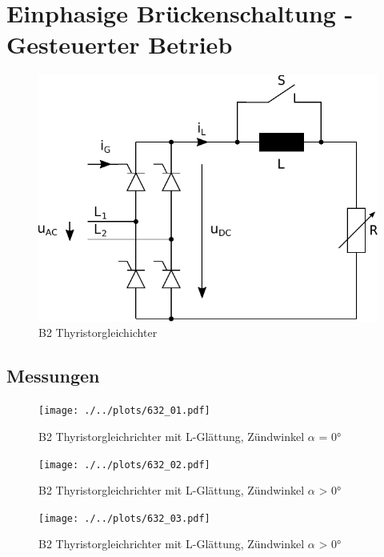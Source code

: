 \section{Einphasige Brückenschaltung - Gesteuerter Betrieb}

\begin{figure}[h!]
    \centering
    \includegraphics[scale=\sscale]{./../fig/b2_thyristor.pdf}
    \caption{B2 Thyristorgleichichter}
    \label{fig:b2_tyristor}
\end{figure}

\subsection{Messungen}

\begin{figure}[h!]
    \centering
    \texttt{[image: ./../plots/632\_01.pdf]}
    \caption{B2 Thyristorgleichrichter mit L-Glättung, Zündwinkel $\alpha$ = 0°}
    \label{fig:b2_diode_l16}
\end{figure}

\begin{figure}[h!]
    \centering
    \texttt{[image: ./../plots/632\_02.pdf]}
    \caption{B2 Thyristorgleichrichter mit L-Glättung, Zündwinkel $\alpha$ > 0°}
    \label{fig:b2_diode_l11}
\end{figure}

\begin{figure}[h!]
    \centering
    \texttt{[image: ./../plots/632\_03.pdf]}
    \caption{B2 Thyristorgleichrichter mit L-Glättung, Zündwinkel $\alpha$ > 0°}
    \label{fig:b2_diode_l6}
\end{figure}

